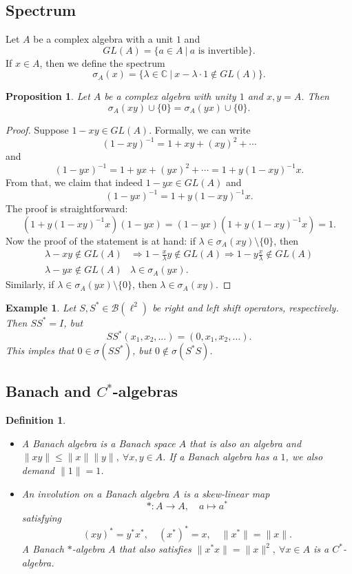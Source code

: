 \documentclass[10pt, a4paper]{article}
\newtheorem{proposition}[thm]{Proposition}
\newtheorem{defi}[thm]{Definition}
\newenvironment{noticeB}{%
  \tcolorbox[%
  notitle,
  empty,
  enhanced,  %
  breakable,
  coltext=black,
  colback=white, 
  fontupper=\rmfamily,
  noparskip,
  sharp corners,
  boxrule=-1pt,  %
  frame hidden,
  left=7pt,  %
  right=7pt,
  top=5pt,
  bottom=5pt,
  before skip=2.5ex plus 2pt,
  after skip=2.5ex plus 2pt,
  borderline west = {1.5pt}{-0.1pt}{blue!30!black}, %
  overlay unbroken and last={%
    \draw[color=black, line width=1.25pt]
    ($(frame.south west)+(1.pt, -0.1pt)$) -- ++(2em, 0);
  }
  ]}
{\endtcolorbox}
\newenvironment{definition}{\begin{noticeB}\begin{defi}}{%
    \end{defi}\end{noticeB}}
\newtheorem{example}[thm]{Example}
\newenvironment{noticeC}{%
  \tcolorbox[%
  notitle,
  empty,
  enhanced,  %
  breakable,
  coltext=black, 
  fontupper=\rmfamily,
  noparskip,
  sharp corners,
  boxrule=-1pt,  %
  frame hidden,
  left=7pt,  %
  right=7pt,
  top=5pt,
  bottom=5pt,
  before skip=2.5ex plus 2pt,
  after skip=2.5ex plus 2pt,
  overlay unbroken and last={%
  },
  ]}
{\endtcolorbox}
\newenvironment{myproof}%
  {\begin{noticeC}\begin{proof}}%
  {\end{proof}\end{noticeC}}
\newcommand{\C}{\mathbb {C}}
\begin{document}
\subsection{Spectrum}

Let $A$ be a complex algebra with a unit $1$ and 
$$GL (A) = \{a \in A\ |\ \textrm{$a$ is invertible}\}.$$
If $x \in A$, then we define the spectrum 
$$\sigma_A (x) = \{\lambda \in \C\ |\ x - \lambda \cdot 1 \notin GL(A)\}.$$
\begin{proposition}
  Let $A$ be a complex algebra with unity $1$ and $x, y = A$. Then 
  $$\sigma_A (xy) \cup \{0\} = \sigma_A (yx) \cup \{0\}.$$
\end{proposition}

\begin{myproof}
  Suppose $1 - xy \in GL(A)$. Formally, we can write 
  $$(1 - xy)^{-1} = 1 + xy + (xy)^2 + \cdots$$
  and $$(1 - yx)^{-1} = 1 + yx + (yx)^2 + \cdots = 1 + y(1 - xy)^{-1} x.$$
  From that, we claim that indeed $1 - yx \in GL (A)$ and 
  $$(1 - yx)^{-1} = 1 + y(1 - xy)^{-1} x.$$ 
  The proof is straightforward: 
  \begin{equation*}
    (1 + y(1 - xy)^{-1} x)(1 - yx) = (1 - yx) (1 + y(1 - xy)^{-1} x) = 1. 
  \end{equation*}
  Now the proof of the statement is at hand: if $\lambda \in \sigma_A (xy) \setminus \{0\}$,
  then \begin{align*}
    \lambda - xy \notin GL (A) & \Rightarrow 1 - \frac{x}{\lambda} y \notin GL (A) \Rightarrow 1 - y \frac{x}{\lambda} \notin GL (A)\\
    \lambda - yx \notin GL (A) & \lambda \in \sigma_A (yx).
  \end{align*}
  Similarly, if $\lambda \in \sigma_A (yx) \setminus \{0\}$, then $\lambda \in \sigma_A (xy)$.
\end{myproof}

\begin{example}
  Let $S, S^* \in \mathcal{B}(\ell^2)$ be right and left shift operators, respectively.
  Then $S S^* = I$, but $$S S^* (x_1, x_2, \dots) = (0, x_1, x_2, \dots).$$
  This imples that $0 \in \sigma (S S^*)$, but $0 \notin \sigma (S^* S)$.
\end{example}

\subsection{Banach and $C^*$-algebras}

\begin{definition}
  \begin{itemize}
    \item A Banach algebra is a Banach space $A$ that is also an algebra and $\|xy\| \leq \|x\| \|y\|,\ \forall x, y \in A$.
    If a Banach algebra has a $1$, we also demand $\|1\| = 1$.
    \item An involution on a Banach algebra $A$ is a skew-linear map $$*: A \to A,\quad a \mapsto a^*$$
    satisfying $$(xy)^* = y^* x^*,\quad (x^*)^* = x,\quad \|x^*\| = \|x\|.$$
    A Banach $*$-algebra $A$ that also satisfies $\|x^* x\| = \|x\|^2,\ \forall x \in A$ is a $C^*$-algebra.
  \end{itemize}
\end{definition}
\end{document}
